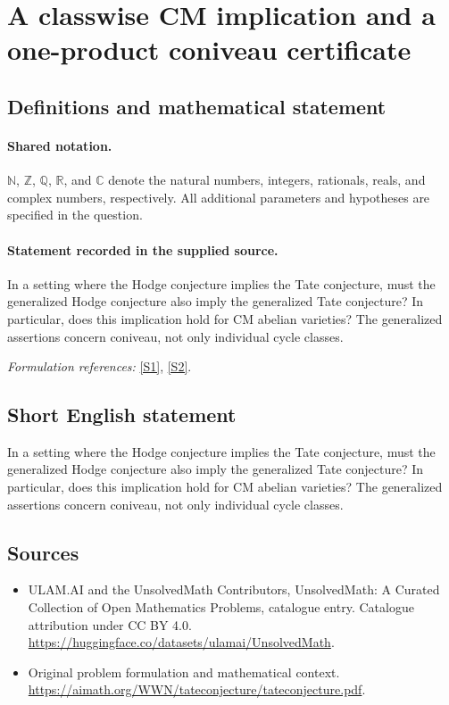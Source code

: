 \documentclass[11pt]{article}
\newcommand{\sref}[2]{\hyperlink{source:#1:#2}{[S#2]}}
\begin{document}
\section{A classwise CM implication and a one-product coniveau certificate}\label{statement}

\subsection{Definitions and mathematical statement}

\paragraph{Shared notation.}$\mathbb N$, $\mathbb Z$, $\mathbb Q$, $\mathbb R$, and $\mathbb C$ denote the natural numbers, integers, rationals, reals, and complex numbers, respectively. All additional parameters and hypotheses are specified in the question.


\paragraph{Statement recorded in the supplied source.}
In a setting where the Hodge conjecture implies the Tate conjecture, must the generalized Hodge conjecture also imply the generalized Tate conjecture? In particular, does this implication hold for CM abelian varieties? The generalized assertions concern coniveau, not only individual cycle classes.
\par\smallskip\textit{Formulation references:} \sref{statement}{1}, \sref{statement}{2}.
\subsection{Short English statement}
In a setting where the Hodge conjecture implies the Tate conjecture, must the generalized Hodge conjecture also imply the generalized Tate conjecture? In particular, does this implication hold for CM abelian varieties? The generalized assertions concern coniveau, not only individual cycle classes.
\subsection{Sources}
\begin{itemize}
\item[\hypertarget{source:statement:1}{S1}] ULAM.AI and the UnsolvedMath Contributors, UnsolvedMath: A Curated Collection of Open Mathematics Problems, catalogue entry. Catalogue attribution under CC BY 4.0.
\url{https://huggingface.co/datasets/ulamai/UnsolvedMath}.
\item[\hypertarget{source:statement:2}{S2}] Original problem formulation and mathematical context.
\url{https://aimath.org/WWN/tateconjecture/tateconjecture.pdf}.
\end{itemize}
\label{end:statement}
\end{document}
